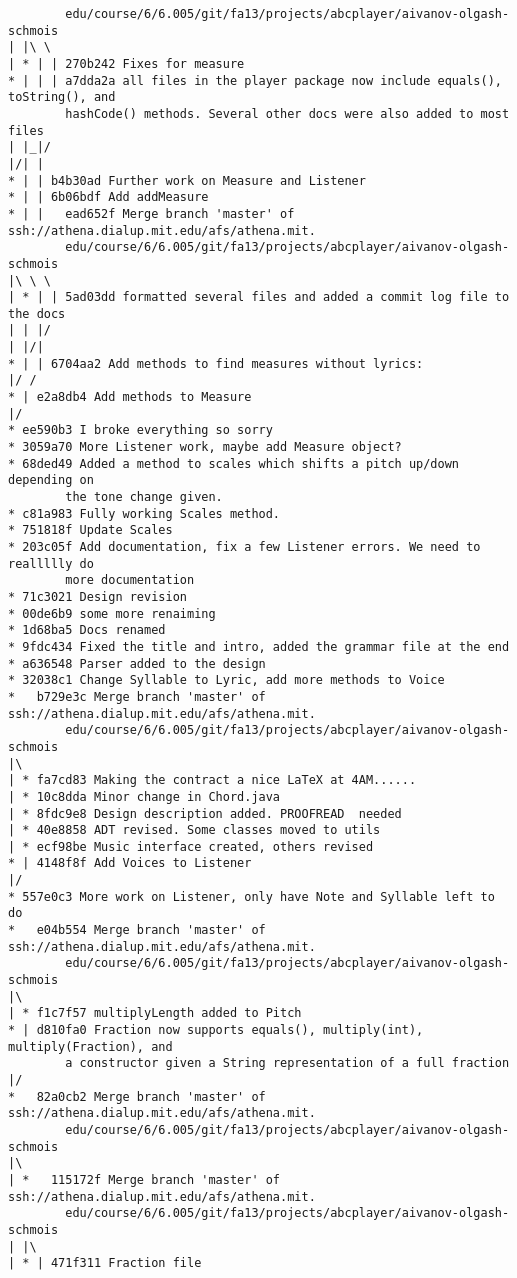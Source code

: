 \documentclass[12pt]{book}
\begin{document}
\begin{Verbatim}
        edu/course/6/6.005/git/fa13/projects/abcplayer/aivanov-olgash-schmois
| |\ \
| * | | 270b242 Fixes for measure
* | | | a7dda2a all files in the player package now include equals(), toString(), and 
        hashCode() methods. Several other docs were also added to most files
| |_|/
|/| |
* | | b4b30ad Further work on Measure and Listener
* | | 6b06bdf Add addMeasure
* | |   ead652f Merge branch 'master' of ssh://athena.dialup.mit.edu/afs/athena.mit.
        edu/course/6/6.005/git/fa13/projects/abcplayer/aivanov-olgash-schmois
|\ \ \
| * | | 5ad03dd formatted several files and added a commit log file to the docs
| | |/
| |/|
* | | 6704aa2 Add methods to find measures without lyrics:
|/ /
* | e2a8db4 Add methods to Measure
|/
* ee590b3 I broke everything so sorry
* 3059a70 More Listener work, maybe add Measure object?
* 68ded49 Added a method to scales which shifts a pitch up/down depending on 
        the tone change given.
* c81a983 Fully working Scales method.
* 751818f Update Scales
* 203c05f Add documentation, fix a few Listener errors. We need to reallllly do 
        more documentation
* 71c3021 Design revision
* 00de6b9 some more renaiming
* 1d68ba5 Docs renamed
* 9fdc434 Fixed the title and intro, added the grammar file at the end
* a636548 Parser added to the design
* 32038c1 Change Syllable to Lyric, add more methods to Voice
*   b729e3c Merge branch 'master' of ssh://athena.dialup.mit.edu/afs/athena.mit.
        edu/course/6/6.005/git/fa13/projects/abcplayer/aivanov-olgash-schmois
|\
| * fa7cd83 Making the contract a nice LaTeX at 4AM......
| * 10c8dda Minor change in Chord.java
| * 8fdc9e8 Design description added. PROOFREAD  needed
| * 40e8858 ADT revised. Some classes moved to utils
| * ecf98be Music interface created, others revised
* | 4148f8f Add Voices to Listener
|/
* 557e0c3 More work on Listener, only have Note and Syllable left to do
*   e04b554 Merge branch 'master' of ssh://athena.dialup.mit.edu/afs/athena.mit.
        edu/course/6/6.005/git/fa13/projects/abcplayer/aivanov-olgash-schmois
|\
| * f1c7f57 multiplyLength added to Pitch
* | d810fa0 Fraction now supports equals(), multiply(int), multiply(Fraction), and 
        a constructor given a String representation of a full fraction
|/
*   82a0cb2 Merge branch 'master' of ssh://athena.dialup.mit.edu/afs/athena.mit.
        edu/course/6/6.005/git/fa13/projects/abcplayer/aivanov-olgash-schmois
|\
| *   115172f Merge branch 'master' of ssh://athena.dialup.mit.edu/afs/athena.mit.
        edu/course/6/6.005/git/fa13/projects/abcplayer/aivanov-olgash-schmois
| |\
| * | 471f311 Fraction file

\end{Verbatim}
\end{document}
